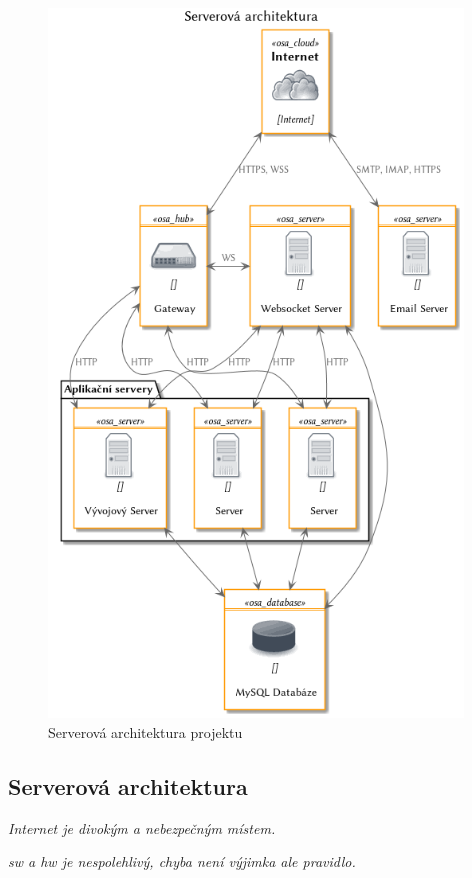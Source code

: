 \begin{figure}[!ht]
\centering
\includegraphics[width=11cm]{img/serverova-architektura.png}
\caption{Serverová architektura projektu \bso{}}
\label{fig:servery}
\end{figure}

\clearpage

\subsection{Serverová architektura}

\emptyLine

\begin{displayquote}
\textit{Internet je divokým a nebezpečným místem\cite{internet-is-dangerous-place}.}
\end{displayquote}

\begin{displayquote}
\textit{\acrlong{sw} a \acrlong{hw} je nespolehlivý, chyba není výjimka ale pravidlo\cite{failure-is-rule-not-exception}.}
\end{displayquote}

